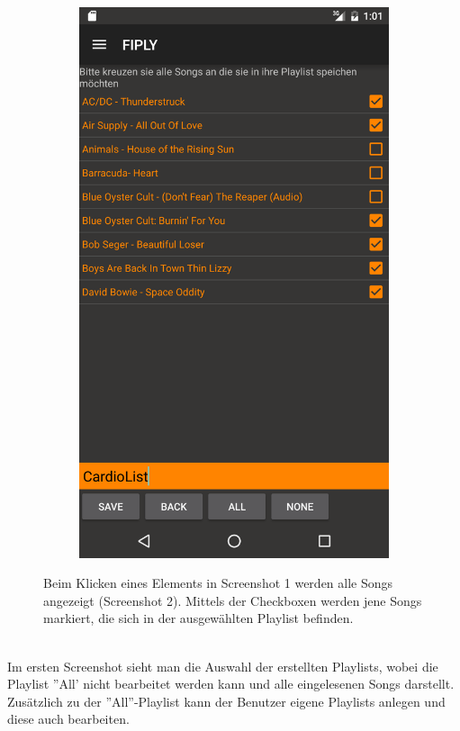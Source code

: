 \documentclass[FIPLY_base.tex]{subfiles}
\begin{document}
\begin{figure}[H]
\begin{subfigure}[b]{0.3\textwidth}
	\includegraphics[scale=0.13]{img/musicSongView1}
	\end{subfigure}
	\caption{Beim Klicken eines Elements in Screenshot 1 werden alle Songs angezeigt (Screenshot 2). 
	Mittels der Checkboxen werden jene Songs markiert, die sich in der ausgewählten Playlist befinden.}
\end{figure}

\ \\
Im ersten Screenshot sieht man die Auswahl der erstellten Playlists, wobei die Playlist ''All' nicht bearbeitet werden kann und alle eingelesenen Songs darstellt.
Zusätzlich zu der ''All''-Playlist kann der Benutzer eigene Playlists anlegen und diese auch bearbeiten.
\end{document}
